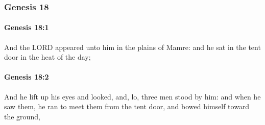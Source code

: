 	\subsubsection{Genesis 18} %
		\label{GENESIS-18}

		\paragraph{Genesis 18:1} %
			\label{GENESIS-18-1}

			And the LORD appeared unto him in the plains of Mamre: and he sat in the tent door in the heat of the day;


		\paragraph{Genesis 18:2} %
			\label{GENESIS-18-2}

			And he lift up his eyes and looked, and, lo, three men stood by him: and when he saw them, he ran to meet them from the tent door, and bowed himself toward the ground,

